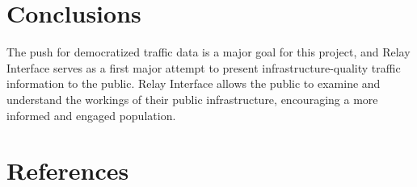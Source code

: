 \documentclass[a4paper,11pt]{article}
\begin{document}
\begin{multicols}{2}
\section{Conclusions}

The push for democratized traffic data is a major goal for this project, and Relay Interface serves as a first major attempt to present infrastructure-quality traffic information to the public. Relay Interface allows the public to examine and understand the workings of their public infrastructure, encouraging a more informed and engaged population.

\section{References}




\end{multicols}
\end{document}
